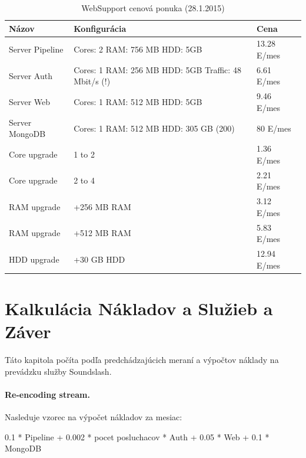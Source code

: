 \documentclass[11pt]{article}
\begin{document}
\begin{table}[htp]
\centering
\begin{tabular}{|l|p{4cm}|l|}
\hline
	Názov & Konfigurácia & Cena \\
\hline
	Server Pipeline & 
	Cores: 2 \newline
	RAM: 756 MB \newline
	HDD: 5GB
	& 13.28 E/mes
	\\
\hline
	Server Auth &
	Cores: 1 \newline
	RAM: 256 MB \newline
	HDD: 5GB \newline
	Traffic: 48 Mbit/s (!)
	& 6.61 E/mes
	\\
\hline
	Server Web &
	Cores: 1 \newline
	RAM: 512 MB \newline
	HDD: 5GB
	& 9.46 E/mes
	\\
\hline
	Server MongoDB &
	Cores: 1 \newline
	RAM: 512 MB \newline
	HDD: 305 GB (200)
	& 80 E/mes
	\\
\hline
	Core upgrade  & 1 to 2 & 1.36 E/mes \\
\hline
	Core upgrade  & 2 to 4 & 2.21 E/mes \\
\hline
	RAM upgrade & +256 MB RAM & 3.12 E/mes \\
\hline
	RAM upgrade & +512 MB RAM & 5.83 E/mes \\
\hline
	HDD upgrade & +30 GB HDD & 12.94 E/mes \\
\hline
\end{tabular}

\caption{WebSupport cenová ponuka (28.1.2015)}
\label{sumkonf2} 
\end{table}

\section{Kalkulácia Nákladov a Služieb a Záver}

Táto kapitola počíta podľa predchádzajúcich meraní a výpočtov náklady na prevádzku služby Soundslash.

\paragraph{Re-encoding stream.} Nasleduje vzorec na výpočet nákladov za mesiac:

\begin{code}
  0.1 * Pipeline 
+ 0.002 * pocet posluchacov * Auth
+ 0.05  * Web
+ 0.1   * MongoDB
\end{code}
\end{document}
